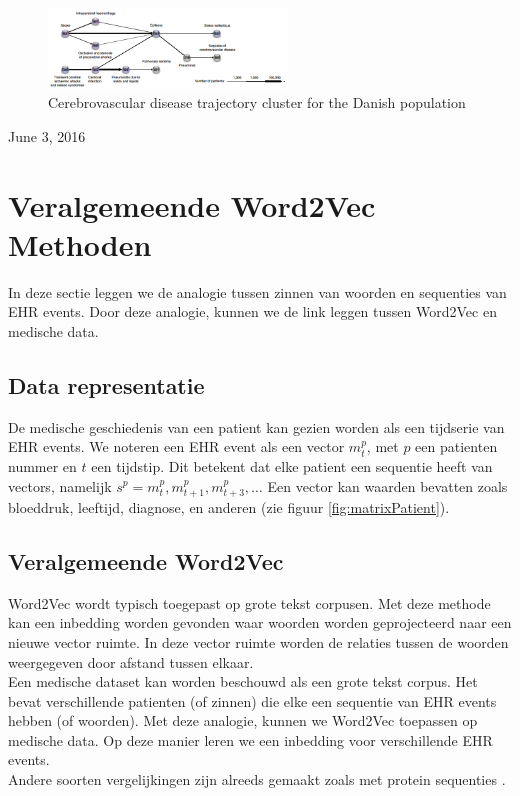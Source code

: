 \documentclass[11pt, final, journal, twoside, a4paper]{IEEEtran}
\begin{document}
\begin{figure}[!htb]
	\centering
	\includegraphics[width=2.5in]{clusterGraphDanish.png}
	\caption{Cerebrovascular disease trajectory cluster for the Danish population \cite{Brunak:article}}
	\label{fig:clusterGraphDanish}
\end{figure}
 
\hfill June 3, 2016



\section{Veralgemeende Word2Vec Methoden}
In deze sectie leggen we de analogie tussen zinnen van woorden en sequenties van EHR events. Door deze analogie, kunnen we de link leggen tussen Word2Vec \cite{w2vOriginal:article} en medische data.

\subsection{Data representatie}

De medische geschiedenis van een patient kan gezien worden als een tijdserie van EHR events. We noteren een EHR event als een vector $m^p_t$, met $p$ een patienten nummer en $t$ een tijdstip. Dit betekent dat elke patient een sequentie heeft van vectors, namelijk $s^p = m^p_t, m^p_{t+1}, m^p_{t+3}, \ldots$ Een vector kan waarden bevatten zoals bloeddruk, leeftijd, diagnose, en anderen (zie figuur \ref{fig:matrixPatient}).

\subsection{Veralgemeende Word2Vec}

Word2Vec wordt typisch toegepast op grote tekst corpusen. Met deze methode kan een inbedding worden gevonden waar woorden worden geprojecteerd naar een nieuwe vector ruimte. In deze vector ruimte worden de relaties tussen de woorden weergegeven door afstand tussen elkaar. \\

Een medische dataset kan worden beschouwd als een grote tekst corpus. Het bevat verschillende patienten (of zinnen) die elke een sequentie van EHR events hebben (of woorden). Met deze analogie, kunnen we Word2Vec toepassen op medische data. Op deze manier leren we een inbedding voor verschillende EHR events. \\
Andere soorten vergelijkingen zijn alreeds gemaakt zoals met protein sequenties \cite{protvec:article}.
\end{document}
